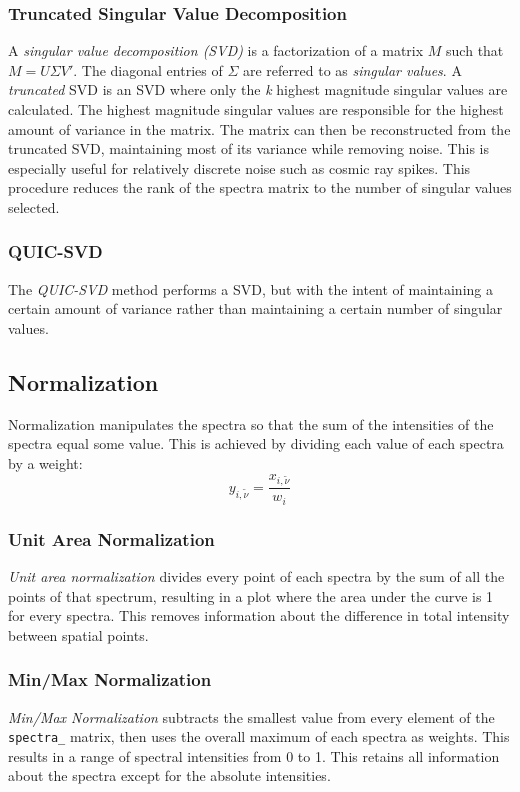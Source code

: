 \documentclass[12pt]{achemso} %
\begin{document}
\subsubsection{Truncated Singular Value Decomposition} A \emph{singular value
decomposition (SVD)} is a factorization of a matrix \(M\) such that
\(M=U{\Sigma}V'\). The diagonal entries of \({\Sigma}\) are referred to as
\emph{singular values}. A \emph{truncated} SVD is an SVD where only the \emph{k}
highest magnitude singular values are calculated. The highest magnitude singular
values are responsible for the highest amount of variance in the matrix. The
matrix can then be reconstructed from the truncated SVD, maintaining most of its
variance while removing noise. This is especially useful for relatively discrete
noise such as cosmic ray spikes. This procedure reduces the rank of the spectra
matrix to the number of singular values selected. 

\subsubsection{QUIC-SVD} The
\emph{QUIC-SVD} method performs a SVD, but with the intent of maintaining a certain
amount of variance rather than maintaining a certain number of singular values.

\subsection{Normalization} Normalization manipulates the spectra so that the sum
of the intensities of the spectra equal some value. This is achieved by dividing each
value of each spectra by a weight:
\[
y_{i, \tilde{\nu}} = \frac{x_{i, \tilde{\nu}}}{w_i}
\]


\subsubsection{Unit Area Normalization} 
\emph{Unit area normalization} divides
every point of each spectra by the sum of all the points of that spectrum,
resulting in a plot where the area under the curve is 1 for every spectra. This
removes information about the difference in total intensity between spatial
points.

\subsubsection{Min/Max Normalization} 
\emph{Min/Max Normalization} subtracts the smallest value from every
element of the \texttt{spectra\_} matrix, then uses the overall maximum of each spectra as weights. 
This results in a range of spectral intensities from 0 to 1. This retains all information about the spectra except for the
absolute intensities.
\end{document}
